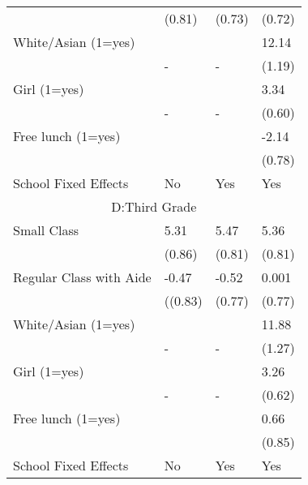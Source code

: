 \begin{tabular}[H]{ |p{4cm}p{2cm}p{2cm}p{2cm}|}
&(0.81)&(0.73)&(0.72)\\
White/Asian (1=yes)&&&12.14\\
&-&-&(1.19)\\
Girl (1=yes)&&&3.34\\
&-&-&(0.60)\\
Free lunch (1=yes)&&&-2.14\\
&&&(0.78)\\
School Fixed Effects & No&Yes&Yes\\
\multicolumn{4}{|c|}{D:Third Grade} \\
Small Class& 5.31&5.47&5.36\\
&(0.86)&(0.81)&(0.81)\\
Regular Class with Aide&-0.47&-0.52&0.001\\
&((0.83)&(0.77)&(0.77)\\
White/Asian (1=yes)&&&11.88\\
&-&-&(1.27)\\
Girl (1=yes)&&&3.26\\
&-&-&(0.62)\\
Free lunch (1=yes)&&&0.66\\
&&&(0.85)\\
School Fixed Effects & No&Yes&Yes\\
\hline
\end{tabular}

